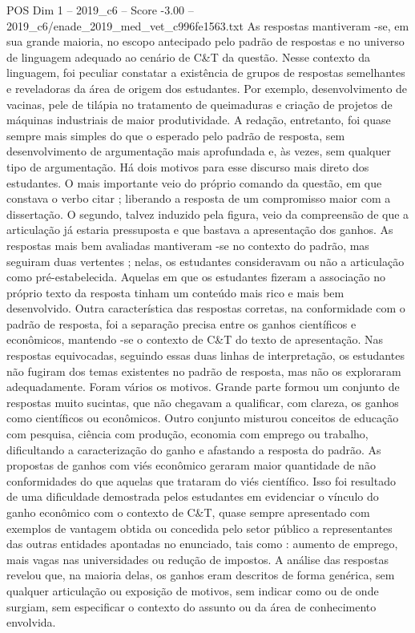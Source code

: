 \begin{textsample}{POS Dim 1 – 2019\_c6 – Score -3.00 – 2019\_c6/enade\_2019\_med\_vet\_c996fe1563.txt}
As respostas mantiveram -se, em sua grande maioria, no escopo antecipado pelo padrão de respostas e no universo de linguagem adequado ao cenário de C\&T da questão.
Nesse contexto da linguagem, foi peculiar constatar a existência de grupos de respostas semelhantes e reveladoras da área de origem dos estudantes.
Por exemplo, desenvolvimento de vacinas, pele de tilápia no tratamento de queimaduras e criação de projetos de máquinas industriais de maior produtividade.
A redação, entretanto, foi quase sempre mais simples do que o esperado pelo padrão de resposta, sem desenvolvimento de argumentação mais aprofundada e, às vezes, sem qualquer tipo de argumentação.
Há dois motivos para esse discurso mais direto dos estudantes.
O mais importante veio do próprio comando da questão, em que constava o verbo citar ; liberando a resposta de um compromisso maior com a dissertação.
O segundo, talvez induzido pela figura, veio da compreensão de que a articulação já estaria pressuposta e que bastava a apresentação dos ganhos.
As respostas mais bem avaliadas mantiveram -se no contexto do padrão, mas seguiram duas vertentes ; nelas, os estudantes consideravam ou não a articulação como pré-estabelecida.
Aquelas em que os estudantes fizeram a associação no próprio texto da resposta tinham um conteúdo mais rico e mais bem desenvolvido.
Outra característica das respostas corretas, na conformidade com o padrão de resposta, foi a separação precisa entre os ganhos científicos e econômicos, mantendo -se o contexto de C\&T do texto de apresentação.
Nas respostas equivocadas, seguindo essas duas linhas de interpretação, os estudantes não fugiram dos temas existentes no padrão de resposta, mas não os exploraram adequadamente.
Foram vários os motivos.
Grande parte formou um conjunto de respostas muito sucintas, que não chegavam a qualificar, com clareza, os ganhos como científicos ou econômicos.
Outro conjunto misturou conceitos de educação com pesquisa, ciência com produção, economia com emprego ou trabalho, dificultando a caracterização do ganho e afastando a resposta do padrão.
As propostas de ganhos com viés econômico geraram maior quantidade de não conformidades do que aquelas que trataram do viés científico.
Isso foi resultado de uma dificuldade demostrada pelos estudantes em evidenciar o vínculo do ganho econômico com o contexto de C\&T, quase sempre apresentado com exemplos de vantagem obtida ou concedida pelo setor público a representantes das outras entidades apontadas no enunciado, tais como : aumento de emprego, mais vagas nas universidades ou redução de impostos.
A análise das respostas revelou que, na maioria delas, os ganhos eram descritos de forma genérica, sem qualquer articulação ou exposição de motivos, sem indicar como ou de onde surgiam, sem especificar o contexto do assunto ou da área de conhecimento envolvida.

\end{textsample}
